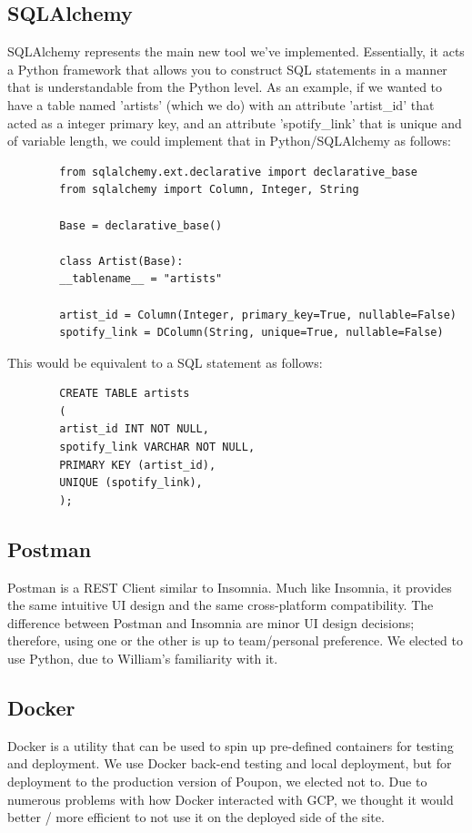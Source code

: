 \documentclass{scrartcl}
\begin{document}
    \subsection{SQLAlchemy}\label{subsec:sqlalchemy}
    SQLAlchemy represents the main new tool we've implemented.
    Essentially, it acts a Python framework that allows you to construct SQL statements in a manner that is understandable from the Python level.
    As an example, if we wanted to have a table named 'artists' (which we do) with an attribute 'artist\_id' that acted as a integer primary key, and an attribute 'spotify\_link' that is unique and of variable length, we could implement that in Python/SQLAlchemy as follows:

    \begin{verbatim}
        from sqlalchemy.ext.declarative import declarative_base
        from sqlalchemy import Column, Integer, String

        Base = declarative_base()

        class Artist(Base):
        __tablename__ = "artists"

        artist_id = Column(Integer, primary_key=True, nullable=False)
        spotify_link = DColumn(String, unique=True, nullable=False)
    \end{verbatim}

    This would be equivalent to a SQL statement as follows:

    \begin{verbatim}
        CREATE TABLE artists
        (
        artist_id INT NOT NULL,
        spotify_link VARCHAR NOT NULL,
        PRIMARY KEY (artist_id),
        UNIQUE (spotify_link),
        );
    \end{verbatim}

    \subsection{Postman}\label{subsec:postman}
    Postman is a REST Client similar to Insomnia.
    Much like Insomnia, it provides the same intuitive UI design and the same cross-platform compatibility.
    The difference between Postman and Insomnia are minor UI design decisions;
    therefore, using one or the other is up to team/personal preference.
    We elected to use Python, due to William's familiarity with it.

    \subsection{Docker}\label{subsec:docker}
    Docker is a utility that can be used to spin up pre-defined containers for testing and deployment.
    We use Docker back-end testing and local deployment, but for deployment to the production version of Poupon, we elected not to.
    Due to numerous problems with how Docker interacted with GCP, we thought it would better / more efficient to not use it on the deployed side of the site.
\end{document}

